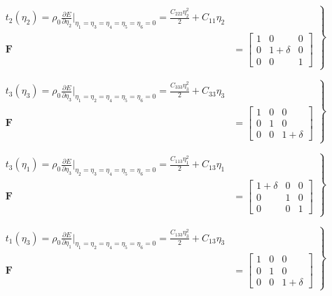 \documentclass[showpacs,aps,floatfix,prb,reprint,superscriptaddress,onecolumn]{revtex4-1}
\begin{document}
\begin{enumerate}
\begin{equation}
\label{eqn:SM-s2}
  \left.\begin{aligned}
        t_{2} \left(\eta_{2}\right) = \rho_{0} \frac{\partial E}{\partial \eta_{2}}\Bigr|_{\eta_1=\eta_3=\eta_4=\eta_5=\eta_6=0} = \frac{C_{222}\eta_{2}^2}{2} + C_{11}\eta_{2}\\
        \bm{F}&=\begin{bmatrix} 1 & 0 & 0 \\ 0 & 1+\delta & 0 \\ 0 & 0 & 1 \end{bmatrix}
       \end{aligned}
			\right\}
\end{equation}


\begin{equation}
\label{eqn:SM-s3}
  \left.\begin{aligned}
        t_{3} \left(\eta_{3}\right) = \rho_{0} \frac{\partial E}{\partial \eta_{3}}\Bigr|_{\eta_1=\eta_2=\eta_4=\eta_5=\eta_6=0} = \frac{C_{333}\eta_{3}^2}{2} + C_{33}\eta_{3}\\
        \bm{F}&=\begin{bmatrix} 1 & 0 & 0 \\ 0 & 1 & 0 \\ 0 & 0 & 1+\delta \end{bmatrix}
       \end{aligned}
			\right\}
\end{equation}


\begin{equation}
\label{eqn:SM-s4}
  \left.\begin{aligned}
        t_{3} \left(\eta_{1}\right) = \rho_{0} \frac{\partial E}{\partial \eta_{3}}\Bigr|_{\eta_2=\eta_3=\eta_4=\eta_5=\eta_6=0} = \frac{C_{113}\eta_{1}^2}{2} + C_{13}\eta_{1}\\
        \bm{F}&=\begin{bmatrix} 1+\delta & 0 & 0 \\ 0 & 1 & 0 \\ 0 & 0 & 1 \end{bmatrix}
       \end{aligned}
			\right\}
\end{equation}


\begin{equation}
\label{eqn:SM-s5}
  \left.\begin{aligned}
        t_{1} \left(\eta_{3}\right) = \rho_{0} \frac{\partial E}{\partial \eta_{1}}\Bigr|_{\eta_1=\eta_2=\eta_4=\eta_5=\eta_6=0} = \frac{C_{133}\eta_{3}^2}{2} + C_{13}\eta_{3}\\
        \bm{F}&=\begin{bmatrix} 1 & 0 & 0 \\ 0 & 1 & 0 \\ 0 & 0 & 1+\delta \end{bmatrix}
       \end{aligned}
			\right\}
\end{equation}



\end{enumerate}
\end{document}

